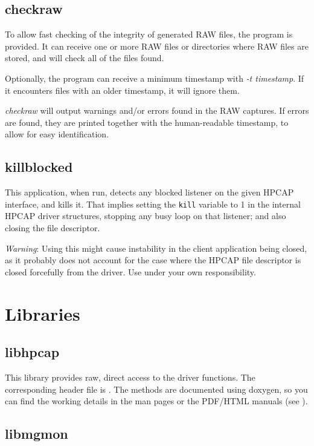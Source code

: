 \documentclass[oneside]{hpman}
\begin{document}
\subsection{checkraw}

To allow fast checking of the integrity of generated RAW files, the  program is provided. It can receive one or more RAW files or directories where RAW files are stored, and will check all of the files found.

Optionally, the program can receive a minimum timestamp with \textit{-t timestamp}. If it encounters files with an older timestamp, it will ignore them.

\textit{checkraw} will output warnings and/or errors found in the RAW captures. If errors are found, they are printed together with the human-readable timestamp, to allow for easy identification.

\subsection{killblocked}

This application, when run, detects any blocked listener on the given HPCAP interface, and kills it. That implies setting the \texttt{kill} variable to 1 in the internal HPCAP driver structures, stopping any busy loop on that listener; and also closing the file descriptor.

\textit{Warning}: Using this might cause instability in the client application being closed, as it probably does not account for the case where the HPCAP file descriptor is closed forcefully from the driver. Use under your own responsibility.

\section{Libraries}
\label{sec:libs}

\subsection{libhpcap}
\label{sec:libs:libhpcap}

This library provides raw, direct access to the driver functions. The corresponding header file is . The methods are documented using doxygen, so you can find the working details in the man pages or the PDF/HTML manuals (see ).

\subsection{libmgmon}
\label{sec:libs:libmgmon}
\end{document}
